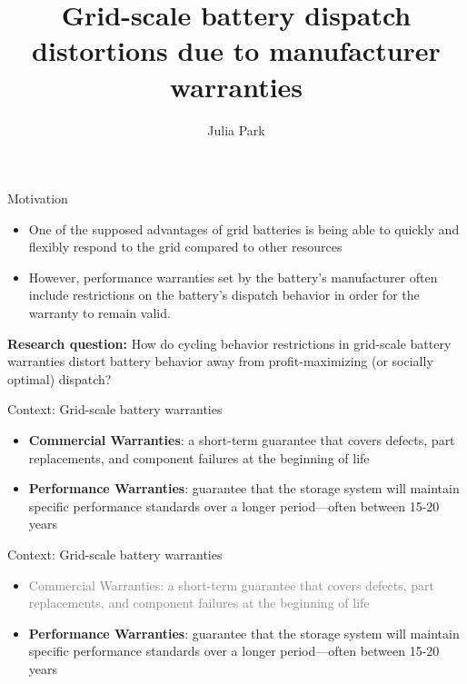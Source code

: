 \documentclass{beamer}
\title{Grid-scale battery dispatch distortions due to manufacturer warranties}
\author{Julia Park}
\begin{document}
\frame{\titlepage}

\begin{frame}{Motivation}
\begin{itemize}
\item  One of the supposed advantages of grid batteries is being able to quickly and flexibly respond to the grid compared to other resources
\item However, performance warranties set by the battery’s manufacturer often include restrictions on the battery’s dispatch behavior in order for the warranty to remain valid. 
\end{itemize}
\pause
\textbf{Research question:} How do cycling behavior restrictions in grid-scale battery warranties distort battery behavior away from profit-maximizing (or socially optimal) dispatch?
\end{frame}

\begin{frame}{Context: Grid-scale battery warranties}
\begin{itemize}
    \item \textbf{Commercial Warranties}: a short-term guarantee that covers defects, part replacements, and component failures at the beginning of life
    \item \textbf{Performance Warranties}: guarantee that the storage system will maintain specific performance standards over a longer period—often between 15-20 years
\end{itemize}
\end{frame}

\begin{frame}{Context: Grid-scale battery warranties}
\begin{itemize}
    \item \textcolor{gray}{Commercial Warranties: a short-term guarantee that covers defects, part replacements, and component failures at the beginning of life}
    \item \textbf{Performance Warranties}: guarantee that the storage system will maintain specific performance standards over a longer period—often between 15-20 years
\end{itemize}
\end{frame}
\end{document}
